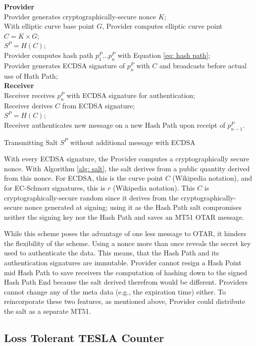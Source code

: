 \documentclass[letterpaper,times]{IONconf/IONconf}
\begin{document}
\begin{algorithm}[H] \label{alg: salt}
\SetAlgoLined
{\bf Provider} \\
Provider generates cryptographically-secure nonce $K$;\\
With elliptic curve base point $G$, Provider computes elliptic curve point $C = K \times G$; \\
$S^P = H(C)$; \\
Provider computes hash path $p^P_1 ... p^P_n$ with Equation \eqref{eq: hash path}; \\
Provider generates ECDSA signature of $p^P_n$ with $C$ and broadcasts before actual use of Hath Path; \\
{\bf Receiver} \\
Receiver receives $p^P_n$ with ECDSA signature for authentication; \\
Receiver derives $C$ from ECDSA signature; \\
$S^P = H(C)$; \\
Receiver authenticates new message on a new Hash Path upon receipt of $p^P_{n-1}$.
\caption{Transmitting Salt $S^P$ without additional message with ECDSA}
\end{algorithm}

With every ECDSA signature, the Provider computes a cryptographically secure nonce.
With Algorithm \ref{alg: salt}, the salt derives from a public quantity derived from this nonce.
For ECDSA, this is the curve point $C$ (Wikipedia notation), and for EC-Schnorr signatures, this is $r$ (Wikipedia notation).
This $C$ is cryptographically-secure random since it derives from the cryptographically-secure nonce generated at signing; using it as the Hash Path salt compromises neither the signing key nor the Hash Path  and saves an MT51 OTAR message.

While this scheme poses the advantage of one less message to OTAR, it hinders the flexibility of the scheme.
Using a nonce more than once reveals the secret key used to authenticate the data.
This means, that the Hash Path and its authentication signatures are immutable.
Provider cannot resign a Hash Point mid Hash Path to save receivers the computation of hashing down to the signed Hash Path End because the salt derived therefrom would be different.
Providers cannot change any of the meta data (e.g., the expiration time) either.
To reincorporate these two features, as mentioned above, Provider could distribute the salt as a separate MT51.

\subsection{Loss Tolerant TESLA Counter} \label{sec: alert salt}
\end{document}
